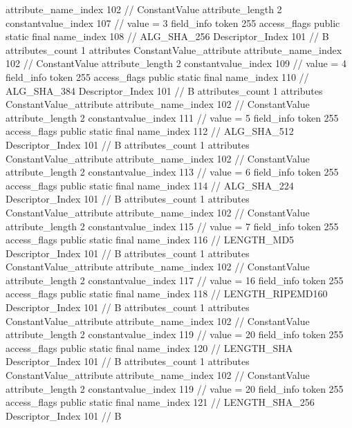 {{{{{{{					attribute_name_index	102		// ConstantValue
					attribute_length	2
					constantvalue_index	107		// value = 3
				}
				}
			}
			field_info {
				token	255
				access_flags	public static final
				name_index	108		// ALG_SHA_256
				Descriptor_Index	101		// B
				attributes_count	1
				attributes {
				ConstantValue_attribute {
					attribute_name_index	102		// ConstantValue
					attribute_length	2
					constantvalue_index	109		// value = 4
				}
				}
			}
			field_info {
				token	255
				access_flags	public static final
				name_index	110		// ALG_SHA_384
				Descriptor_Index	101		// B
				attributes_count	1
				attributes {
				ConstantValue_attribute {
					attribute_name_index	102		// ConstantValue
					attribute_length	2
					constantvalue_index	111		// value = 5
				}
				}
			}
			field_info {
				token	255
				access_flags	public static final
				name_index	112		// ALG_SHA_512
				Descriptor_Index	101		// B
				attributes_count	1
				attributes {
				ConstantValue_attribute {
					attribute_name_index	102		// ConstantValue
					attribute_length	2
					constantvalue_index	113		// value = 6
				}
				}
			}
			field_info {
				token	255
				access_flags	public static final
				name_index	114		// ALG_SHA_224
				Descriptor_Index	101		// B
				attributes_count	1
				attributes {
				ConstantValue_attribute {
					attribute_name_index	102		// ConstantValue
					attribute_length	2
					constantvalue_index	115		// value = 7
				}
				}
			}
			field_info {
				token	255
				access_flags	public static final
				name_index	116		// LENGTH_MD5
				Descriptor_Index	101		// B
				attributes_count	1
				attributes {
				ConstantValue_attribute {
					attribute_name_index	102		// ConstantValue
					attribute_length	2
					constantvalue_index	117		// value = 16
				}
				}
			}
			field_info {
				token	255
				access_flags	public static final
				name_index	118		// LENGTH_RIPEMD160
				Descriptor_Index	101		// B
				attributes_count	1
				attributes {
				ConstantValue_attribute {
					attribute_name_index	102		// ConstantValue
					attribute_length	2
					constantvalue_index	119		// value = 20
				}
				}
			}
			field_info {
				token	255
				access_flags	public static final
				name_index	120		// LENGTH_SHA
				Descriptor_Index	101		// B
				attributes_count	1
				attributes {
				ConstantValue_attribute {
					attribute_name_index	102		// ConstantValue
					attribute_length	2
					constantvalue_index	119		// value = 20
				}
				}
			}
			field_info {
				token	255
				access_flags	public static final
				name_index	121		// LENGTH_SHA_256
				Descriptor_Index	101		// B
}}}}}
